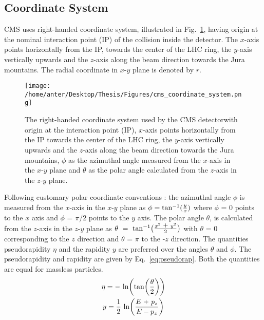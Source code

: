 \subsection{Coordinate System}
CMS uses right-handed coordinate system, illustrated in Fig.~\ref{fig:coordinate}, having origin at the nominal interaction point (IP) of the collision inside the detector. The $x$-axis points horizontally from the IP, towards the center of the LHC ring, the $y$-axis vertically upwards and the $z$-axis along the beam direction towards the Jura mountains. The radial coordinate in $x$-$y$ plane is denoted by $r$. 
\begin{figure}[!h]
\begin{center} 
\hspace*{-15mm}
\texttt{[image: /home/anter/Desktop/Thesis/Figures/cms\_coordinate\_system.png]}
\vspace{3mm}
\caption[The right-handed coordinate system used by the CMS detector.]{The right-handed coordinate system used by the CMS detector\footnotemark with origin at the interaction point (IP), $x$-axis points horizontally from the IP towards the center of the LHC ring, the $y$-axis vertically upwards and the $z$-axis along the beam direction towards the Jura mountains, $\phi$ as the azimuthal angle measured from the $x$-axis in the $x$-$y$ plane and $\theta$ as the polar angle calculated from the $z$-axis in the $z$-$y$ plane.}
\label{fig:coordinate}
\end{center}
\end{figure}
Following customary polar coordinate conventions : the azimuthal angle $\phi$ is measured from the $x$-axis in the $x$-$y$ plane as $\phi = {\rm tan^{-1}}(\frac{y}{x})$ where $\phi$ = 0 points to the \plusn $x$ axis and $\phi$ = $\pi$/2 points to the \plusn $y$ axis. The polar angle $\theta$, is calculated from the $z$-axis in the $z$-$y$ plane as $\theta~=~{\rm tan^{-1}}\big(\frac{x^2~\plus y^2}{2}\big)$ with $\theta$ = 0 corresponding to the \plusn $z$ direction and $\theta$ = $\pi$ to the -$z$ direction. The quantities pseudorapidity $\eta$ and the rapidity $y$ are preferred over the angles $\theta$ and $\phi$. The pseudorapidity and rapidity are given by Eq.~\ref{eq:pseudorap}. Both the quantities are equal for massless particles.
\begin{equation}
\begin{gathered}
\eta = -~{\rm ln}\bigg({\rm tan}\bigg(\frac{\theta}{2}\bigg)\bigg)\\
y = \frac{1}{2}~{\rm ln} \bigg(\frac{E~\plus p_z}{E - p_z} \bigg)
\end{gathered}
\label{eq:pseudorap}
\end{equation}
